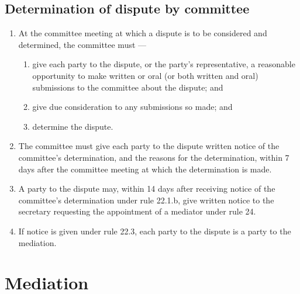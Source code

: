 \documentclass[../constitution.tex]{subfiles}
\begin{document}
\hypertarget{determination-of-dispute-by-committee}{%
\subsection{Determination of dispute by committee}\label{determination-of-dispute-by-committee}}

\begin{enumerate}

\item At the committee meeting at which a dispute is to be considered and determined, the committee must ---

  \begin{enumerate}
  
  \item give each party to the dispute, or the party's representative, a reasonable opportunity to make written or oral (or both written and oral) submissions to the committee about the dispute; and
  \item give due consideration to any submissions so made; and
  \item determine the dispute.
  \end{enumerate}
\item The committee must give each party to the dispute written notice of the committee's determination, and the reasons for the determination, within 7 days after the committee meeting at which the determination is made.
\item A party to the dispute may, within 14 days after receiving notice of the committee's determination under rule 22.1.b, give written notice to the secretary requesting the appointment of a mediator under rule 24. \label{dispute-appoint-mediator}
\item If notice is given under rule 22.3, each party to the dispute is a party to the mediation.
\end{enumerate}

\hypertarget{division-4-mediation}{%
\section{Mediation}\label{division-4-mediation}}

\hypertarget{application-of-division-mediation}{%
\subsection{}\label{application-of-division-mediation}}
\end{document}
